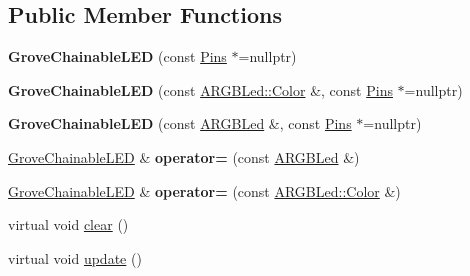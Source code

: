 \subsection*{Public Member Functions}
\begin{DoxyCompactItemize}
\item 
\mbox{\label{classwood_box_1_1display_1_1_grove_chainable_l_e_d_a08c28797b0d3710c34639feb2daa5879}} 
{\bfseries Grove\+Chainable\+L\+ED} (const \mbox{\hyperlink{structwood_box_1_1display_1_1_grove_chainable_l_e_d_1_1_pins}{Pins}} $\ast$=nullptr)
\item 
\mbox{\label{classwood_box_1_1display_1_1_grove_chainable_l_e_d_a12ecc3ce0f2316255f3d84f9ab940192}} 
{\bfseries Grove\+Chainable\+L\+ED} (const \mbox{\hyperlink{structwood_box_1_1display_1_1_a_r_g_b_led_1_1_color}{A\+R\+G\+B\+Led\+::\+Color}} \&, const \mbox{\hyperlink{structwood_box_1_1display_1_1_grove_chainable_l_e_d_1_1_pins}{Pins}} $\ast$=nullptr)
\item 
\mbox{\label{classwood_box_1_1display_1_1_grove_chainable_l_e_d_adbcc3b0c30f0f13c29d0020c053cb51b}} 
{\bfseries Grove\+Chainable\+L\+ED} (const \mbox{\hyperlink{classwood_box_1_1display_1_1_a_r_g_b_led}{A\+R\+G\+B\+Led}} \&, const \mbox{\hyperlink{structwood_box_1_1display_1_1_grove_chainable_l_e_d_1_1_pins}{Pins}} $\ast$=nullptr)
\item 
\mbox{\label{classwood_box_1_1display_1_1_grove_chainable_l_e_d_a626699a65f024fb43a9e017bc75eae78}} 
\mbox{\hyperlink{classwood_box_1_1display_1_1_grove_chainable_l_e_d}{Grove\+Chainable\+L\+ED}} \& {\bfseries operator=} (const \mbox{\hyperlink{classwood_box_1_1display_1_1_a_r_g_b_led}{A\+R\+G\+B\+Led}} \&)
\item 
\mbox{\label{classwood_box_1_1display_1_1_grove_chainable_l_e_d_adeb75f0b0d38e8aa842ec75b5944dc6f}} 
\mbox{\hyperlink{classwood_box_1_1display_1_1_grove_chainable_l_e_d}{Grove\+Chainable\+L\+ED}} \& {\bfseries operator=} (const \mbox{\hyperlink{structwood_box_1_1display_1_1_a_r_g_b_led_1_1_color}{A\+R\+G\+B\+Led\+::\+Color}} \&)
\item 
virtual void \mbox{\hyperlink{classwood_box_1_1display_1_1_grove_chainable_l_e_d_a1c42c42ee9643aa914ab20a191e4adfd}{clear}} ()
\item 
virtual void \mbox{\hyperlink{classwood_box_1_1display_1_1_grove_chainable_l_e_d_a650969665d0b5607465a63159c62e4ef}{update}} ()
\end{DoxyCompactItemize}

